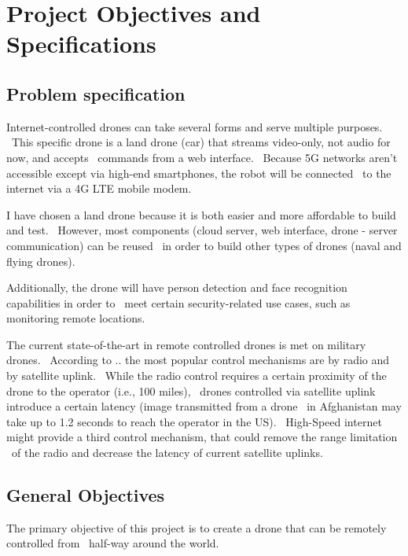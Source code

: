 \usepackage{graphicx}


\chapter{Project Objectives and Specifications}
\label{ch:specification}

\section{Problem specification}
\label{sec:specification-specification}

Internet-controlled drones can take several forms and serve multiple purposes. \
This specific drone is a land drone (car) that streams video-only, not audio for now, and accepts \
commands from a web interface. \
Because 5G networks aren't accessible except via high-end smartphones, the robot will be connected \
to the internet via a 4G LTE mobile modem.

I have chosen a land drone because it is both easier and more affordable to build and test. \
However, most components (cloud server, web interface, drone - server communication) can be reused \
in order to build other types of drones (naval and flying drones).

Additionally, the drone will have person detection and face recognition capabilities in order to \
meet certain security-related use cases, such as monitoring remote locations.

The current state-of-the-art in remote controlled drones is met on military drones. \
According to .. %
the most popular control mechanisms are by radio and by satellite uplink. \
While the radio control requires a certain proximity of the drone to the operator (i.e., 100 miles), \
drones controlled via satellite uplink introduce a certain latency (image transmitted from a drone \
in Afghanistan may take up to 1.2 seconds to reach the operator in the US). \
High-Speed internet might provide a third control mechanism, that could remove the range limitation \
of the radio and decrease the latency of current satellite uplinks.


\section{General Objectives}
\label{sec:specification-objectives}
The primary objective of this project is to create a drone that can be remotely controlled from \
half-way around the world.

